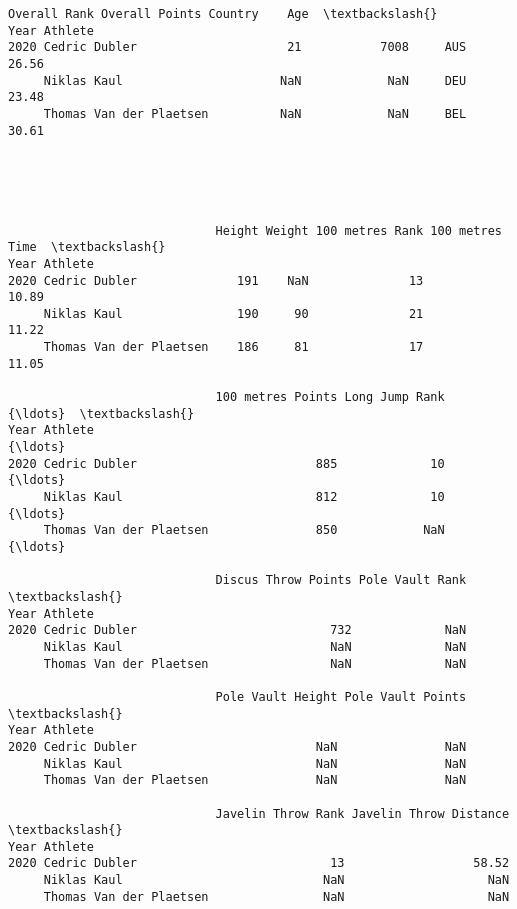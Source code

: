 \documentclass[11pt]{article}
\begin{document}
    
    
    \begin{Verbatim}[commandchars=\\\{\}]
                             Overall Rank Overall Points Country    Age  \textbackslash{}
Year Athlete                                                              
2020 Cedric Dubler                     21           7008     AUS  26.56   
     Niklas Kaul                      NaN            NaN     DEU  23.48   
     Thomas Van der Plaetsen          NaN            NaN     BEL  30.61   





                             Height Weight 100 metres Rank 100 metres Time  \textbackslash{}
Year Athlete                                                                 
2020 Cedric Dubler              191    NaN              13           10.89   
     Niklas Kaul                190     90              21           11.22   
     Thomas Van der Plaetsen    186     81              17           11.05   

                             100 metres Points Long Jump Rank  {\ldots}  \textbackslash{}
Year Athlete                                                   {\ldots}   
2020 Cedric Dubler                         885             10  {\ldots}   
     Niklas Kaul                           812             10  {\ldots}   
     Thomas Van der Plaetsen               850            NaN  {\ldots}   

                             Discus Throw Points Pole Vault Rank  \textbackslash{}
Year Athlete                                                       
2020 Cedric Dubler                           732             NaN   
     Niklas Kaul                             NaN             NaN   
     Thomas Van der Plaetsen                 NaN             NaN   

                             Pole Vault Height Pole Vault Points  \textbackslash{}
Year Athlete                                                       
2020 Cedric Dubler                         NaN               NaN   
     Niklas Kaul                           NaN               NaN   
     Thomas Van der Plaetsen               NaN               NaN   

                             Javelin Throw Rank Javelin Throw Distance  \textbackslash{}
Year Athlete                                                             
2020 Cedric Dubler                           13                  58.52   
     Niklas Kaul                            NaN                    NaN   
     Thomas Van der Plaetsen                NaN                    NaN   


\end{Verbatim}
\end{document}
